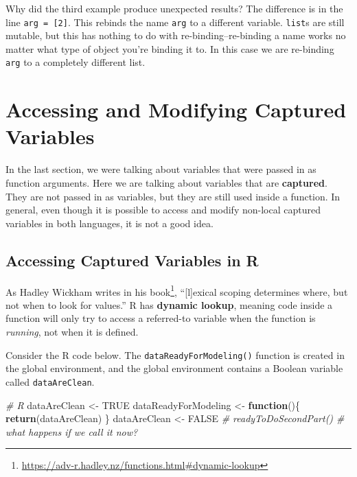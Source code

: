 \documentclass[12pt,krantz2]{krantz}
\makeatletter
\newenvironment{Shaded}{\begin{snugshade}}{\end{snugshade}}
\newcommand{\CommentTok}[1]{\textcolor[rgb]{0.37,0.37,0.37}{\textit{#1}}}
\newcommand{\ControlFlowTok}[1]{\textcolor[rgb]{0.27,0.27,0.27}{\textbf{#1}}}
\newcommand{\KeywordTok}[1]{\textcolor[rgb]{0.27,0.27,0.27}{\textbf{#1}}}
\newcommand{\NormalTok}[1]{#1}
\newcommand{\OtherTok}[1]{\textcolor[rgb]{0.37,0.37,0.37}{#1}}
\newcommand{\StringTok}[1]{\textcolor[rgb]{0.5,0.5,0.5}{#1}}
\renewcommand{\href}[2]{#2\footnote{\url{#1}}}
\newenvironment{kframe}{%
\medskip{}
\setlength{\fboxsep}{.8em}
 \def\at@end@of@kframe{}%
 \ifinner\ifhmode%
  \def\at@end@of@kframe{\end{minipage}}%
  \begin{minipage}{\columnwidth}%
 \fi\fi%
 \def\FrameCommand##1{\hskip\@totalleftmargin \hskip-\fboxsep
 \colorbox{shadecolor}{##1}\hskip-\fboxsep
     \hskip-\linewidth \hskip-\@totalleftmargin \hskip\columnwidth}%
 \MakeFramed {\advance\hsize-\width
   \@totalleftmargin\z@ \linewidth\hsize
   \@setminipage}}%
 {\par\unskip\endMakeFramed%
 \at@end@of@kframe}
\renewenvironment{Shaded}{\begin{kframe}}{\end{kframe}}
\makeatother
\begin{document}
Why did the third example produce unexpected results? The difference is in the line \texttt{arg\ =\ {[}2{]}}. This rebinds the name \texttt{arg} to a different variable. \texttt{list}s are still mutable, but this has nothing to do with re-binding--re-binding a name works no matter what type of object you're binding it to. In this case we are re-binding \texttt{arg} to a completely different list.

\hypertarget{accessing-and-modifying-captured-variables}{%
\section{Accessing and Modifying Captured Variables}\label{accessing-and-modifying-captured-variables}}

In the last section, we were talking about variables that were passed in as function arguments. Here we are talking about variables that are \textbf{captured}. They are not passed in as variables, but they are still used inside a function. In general, even though it is possible to access and modify non-local captured variables in both languages, it is not a good idea.

\hypertarget{accessing-captured-variables-in-r}{%
\subsection{Accessing Captured Variables in R}\label{accessing-captured-variables-in-r}}

As Hadley Wickham writes in \href{https://adv-r.hadley.nz/functions.html\#dynamic-lookup}{his book}, ``{[}l{]}exical scoping determines where, but not when to look for values.'' R has \textbf{dynamic lookup}, meaning code inside a function will only try to access a referred-to variable when the function is \emph{running}, not when it is defined.

Consider the R code below. The \texttt{dataReadyForModeling()} function is created in the global environment, and the global environment contains a Boolean variable called \texttt{dataAreClean}.

\begin{Shaded}
\begin{Highlighting}[]
\CommentTok{# R}
\NormalTok{dataAreClean <-}\StringTok{ }\OtherTok{TRUE}
\NormalTok{dataReadyForModeling <-}\StringTok{ }\ControlFlowTok{function}\NormalTok{()\{}
  \KeywordTok{return}\NormalTok{(dataAreClean)}
\NormalTok{\}}
\NormalTok{dataAreClean <-}\StringTok{ }\OtherTok{FALSE}
\CommentTok{# readyToDoSecondPart() # what happens if we call it now?}
\end{Highlighting}
\end{Shaded}
\end{document}
